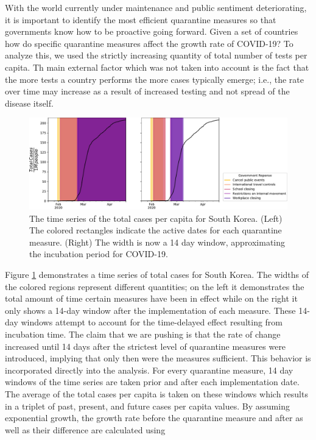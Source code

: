 With the world currently under maintenance and public sentiment deteriorating, it is important to identify
the most efficient quarantine measures so that governments know how to be proactive going forward.
Given a set of countries how do specific quarantine measures affect the growth rate of COVID-19? To analyze this, we used the strictly increasing quantity of total number of tests per capita. Th main external factor which was not taken into account is the fact that the more tests a country performs the more cases typically emerge; i.e., the rate over time
may increase as a result of increased testing and not spread of the disease itself. 
\begin{figure}[h!]
\centering
\includegraphics[width=15cm]{mg1.pdf}
\caption{The time series of the total cases per capita for South Korea. (Left) The colored rectangles indicate the active dates for each quarantine measure. (Right) The width is now a 14 day window, approximating the incubation period for COVID-19.}
\label{fig:SKrate}
\end{figure}
Figure \ref{fig:SKrate} demonstrates a time series of total cases for South Korea. The widths
of the colored regions represent different quantities; on the left it demonstrates the total amount
of time certain measures have been in effect while on the right it only shows a 14-day window
after the implementation of each measure. These 14-day windows attempt to account for the time-delayed effect resulting from incubation time. 
The claim that we are pushing is that the rate of change increased until 14 days after the strictest level of quarantine measures were introduced, implying that only then were the measures sufficient.
This behavior is incorporated directly into the analysis. For every quarantine measure, 14 day windows of the time series are taken prior and after each implementation date. The average of the total cases per capita is taken on these windows which results in a triplet of past, present, and future cases per capita values. By assuming exponential growth,
the growth rate before the quarantine measure and after as well as their difference are calculated using
